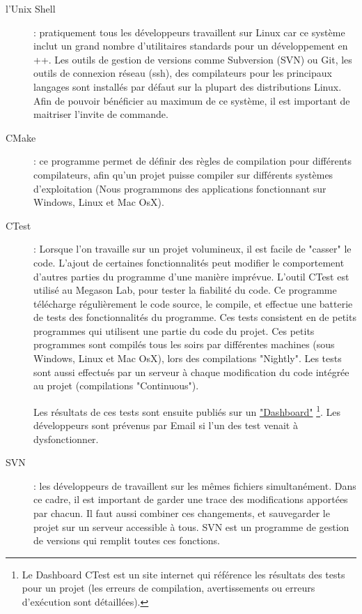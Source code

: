 \begin{description}
  \item[l'Unix Shell] : pratiquement tous les développeurs travaillent sur Linux
  car ce système inclut un grand nombre d'utilitaires
  standards pour un développement en {\C++}.
  Les outils de gestion de versions comme Subversion (SVN) ou Git, les outils de connexion réseau (ssh),
  des compilateurs pour les principaux langages sont installés par défaut sur la
  plupart des distributions Linux.
  Afin de pouvoir bénéficier au maximum de ce système, il est important de maitriser
  l'invite de commande.
  \item[CMake] : ce programme permet de définir des règles de compilation pour différents compilateurs, afin qu'un projet puisse
   compiler sur différents systèmes d'exploitation (Nous programmons des applications fonctionnant sur Windows, Linux et Mac OsX).
  \item[CTest] : Lorsque l'on travaille sur un projet volumineux, il est facile de "casser" le code. L'ajout de certaines fonctionnalités 
  peut modifier le comportement d'autres parties du programme d'une manière imprévue. L'outil CTest est utilisé au Megason Lab, 
  pour tester la fiabilité du code. Ce programme télécharge régulièrement le code source, le compile, et effectue une batterie de tests
  des fonctionnalités du programme. Ces tests consistent en de petits programmes qui utilisent une partie du code du projet.
  Ces petits programmes sont compilés tous les soirs par différentes machines
  (sous Windows, Linux et Mac OsX), lors des compilations "Nightly".
  Les tests sont aussi effectués par un serveur à chaque modification du code intégrée au projet (compilations "Continuous").
  
  Les résultats de ces tests sont ensuite publiés sur un
  \href{http://my.cdash.org/index.php?project=GoFigure2}{"Dashboard"}
  \footnote{
  Le Dashboard CTest est un site internet qui référence les résultats des tests pour un projet (les erreurs de compilation, 
  avertissements ou erreurs d'exécution sont détaillées).}. Les développeurs sont prévenus par Email si l'un des test venait à dysfonctionner.
  \item[SVN] : les développeurs de {\gofigure} travaillent sur les mêmes fichiers simultanément. 
  Dans ce cadre, il est important de garder une trace des modifications apportées par chacun. Il faut aussi combiner ces changements, 
  et sauvegarder le projet sur un serveur accessible à tous. SVN est un programme de gestion de versions qui remplit toutes ces 
  fonctions.
\end{description}


